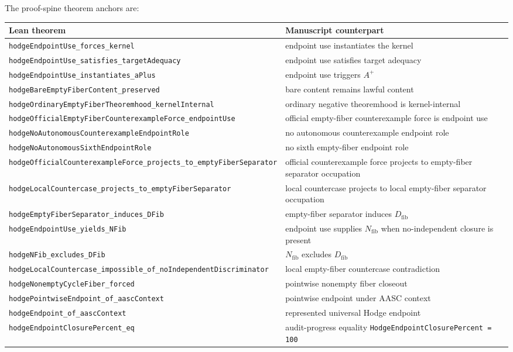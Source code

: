 \documentclass[11pt]{article}
\begin{document}
The proof-spine theorem anchors are:
{\scriptsize
\begin{longtable}{p{}p{}}
\toprule Lean theorem & Manuscript counterpart\\ \midrule\endhead
\texttt{hodgeEndpointUse\_forces\_kernel} & endpoint use instantiates the kernel\\
\texttt{hodgeEndpointUse\_satisfies\_targetAdequacy} & endpoint use satisfies target adequacy\\
\texttt{hodgeEndpointUse\_instantiates\_aPlus} & endpoint use triggers $A^+$\\
\texttt{hodgeBareEmptyFiberContent\_preserved} & bare content remains lawful content\\
\texttt{hodgeOrdinaryEmptyFiberTheoremhood\_kernelInternal} & ordinary negative theoremhood is kernel-internal\\
\texttt{hodgeOfficialEmptyFiberCounterexampleForce\_endpointUse} & official empty-fiber counterexample force is endpoint use\\
\texttt{hodgeNoAutonomousCounterexampleEndpointRole} & no autonomous counterexample endpoint role\\
\texttt{hodgeNoAutonomousSixthEndpointRole} & no sixth empty-fiber endpoint role\\
\texttt{hodgeOfficialCounterexampleForce\_projects\_to\_emptyFiberSeparator} & official counterexample force projects to empty-fiber separator occupation\\
\texttt{hodgeLocalCountercase\_projects\_to\_emptyFiberSeparator} & local countercase projects to local empty-fiber separator occupation\\
\texttt{hodgeEmptyFiberSeparator\_induces\_DFib} & empty-fiber separator induces $D_{\mathrm{fib}}$\\
\texttt{hodgeEndpointUse\_yields\_NFib} & endpoint use supplies $N_{\mathrm{fib}}$ when no-independent closure is present\\
\texttt{hodgeNFib\_excludes\_DFib} & $N_{\mathrm{fib}}$ excludes $D_{\mathrm{fib}}$\\
\texttt{hodgeLocalCountercase\_impossible\_of\_noIndependentDiscriminator} & local empty-fiber countercase contradiction\\
\texttt{hodgeNonemptyCycleFiber\_forced} & pointwise nonempty fiber closeout\\
\texttt{hodgePointwiseEndpoint\_of\_aascContext} & pointwise endpoint under AASC context\\
\texttt{hodgeEndpoint\_of\_aascContext} & represented universal Hodge endpoint\\
\texttt{hodgeEndpointClosurePercent\_eq} & audit-progress equality \texttt{HodgeEndpointClosurePercent = 100}\\
\bottomrule
\end{longtable}
}
\end{document}

